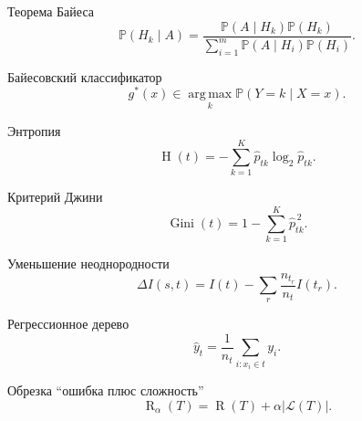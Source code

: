 \documentclass[12pt,a4paper]{article}
\theoremstyle{plain}
\theoremstyle{definition}
\theoremstyle{remark}
\newcommand{\Pp}{\mathbb{P}}
\newcommand{\argmax}{\operatorname*{arg\,max}}
\newcommand{\Entropy}{\operatorname{H}}
\newcommand{\Gini}{\operatorname{Gini}}
\newcommand{\Risk}{\operatorname{R}}
\begin{document}
\begin{importantblock}{Теорема Байеса}
\[
    \Pp(H_k\mid A)
    =
    \frac{
        \Pp(A\mid H_k)\Pp(H_k)
    }{
        \displaystyle
        \sum_{i=1}^{m}
        \Pp(A\mid H_i)\Pp(H_i)
    }.
\]
\end{importantblock}

\begin{importantblock}{Байесовский классификатор}
\[
    g^*(x)
    \in
    \argmax_k\Pp(Y=k\mid X=x).
\]
\end{importantblock}

\begin{importantblock}{Энтропия}
\[
    \Entropy(t)
    =
    -\sum_{k=1}^{K}
    \widehat{p}_{tk}\log_2\widehat{p}_{tk}.
\]
\end{importantblock}

\begin{importantblock}{Критерий Джини}
\[
    \Gini(t)
    =
    1-\sum_{k=1}^{K}\widehat{p}_{tk}^{\,2}.
\]
\end{importantblock}

\begin{importantblock}{Уменьшение неоднородности}
\[
    \Delta I(s,t)
    =
    I(t)
    -
    \sum_{r}
    \frac{n_{t_r}}{n_t}I(t_r).
\]
\end{importantblock}

\begin{importantblock}{Регрессионное дерево}
\[
    \widehat{y}_t
    =
    \frac{1}{n_t}
    \sum_{i:x_i\in t}y_i.
\]
\end{importantblock}

\begin{importantblock}{Обрезка ``ошибка плюс сложность''}
\[
    \Risk_\alpha(T)
    =
    \Risk(T)
    +
    \alpha|\mathcal{L}(T)|.
\]
\end{importantblock}
\end{document}
